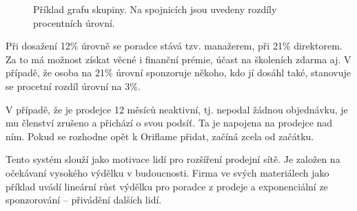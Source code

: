 \documentclass[a4wide,12pt]{report}
\begin{document}
\begin{figure}[h]
\begin{center}
\end{center}
\caption{Příklad grafu skupiny. Na spojnicích jsou uvedeny rozdíly procentních úrovní.}
\label{fig:ggraph}
\end{figure}

Při dosažení 12\% úrovně se poradce stává tzv. manažerem, při 21\% direktorem. Za to má možnost získat věcné i finanční prémie, účast na školeních zdarma aj. V případě, že osoba na 21\% úrovní sponzoruje někoho, kdo jí dosáhl také, stanovuje se procetní rozdíl úrovní na 3\%.

V případě, že je prodejce 12 měsíců neaktivní, tj. nepodal žádnou objednávku, je mu členství zrušeno a přichází o svou podsíť. Ta je napojena na prodejce nad ním. Pokud se rozhodne opět k Oriflame přidat, začíná zcela od začátku.

Tento systém slouží jako motivace lidí pro rozšíření prodejní sítě. Je založen na očekávaní vysokého výdělku v budoucnosti. Firma ve svých materiálech jako příklad uvádí lineární růst výdělku pro poradce z prodeje a exponenciální ze sponzorování -- přivádění dalších lidí.
\end{document}
